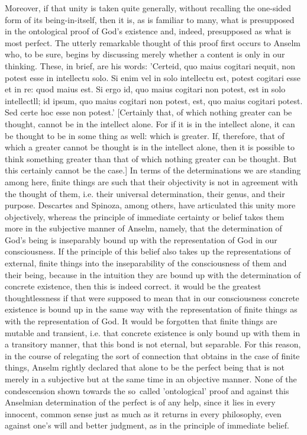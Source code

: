 Moreover, if that unity is taken quite generally,
without recalling the one-sided form of its being-in-itself,
then it is, as is familiar to many,
what is presupposed in the ontological proof of God's existence
and, indeed, presupposed as what is most perfect.
The utterly remarkable thought of this proof
first occurs to Anselm who, to be sure,
begins by discussing merely whether a content is
only in our thinking.
These, in brief, are his words:
'Certeid, quo maius cogitari nequit,
non potest esse in intellectu solo.
Si enim vel in solo intellectu est,
potest cogitari esse et in re: quod maius est.
Si ergo id, quo maius cogitari non potest,
est in solo intellectll;
id ipsum, quo maius cogitari non potest,
est, quo maius cogitari potest.
Sed certe hoc esse non potest.'
[Certainly that, of which nothing greater can be thought,
cannot be in the intellect alone.
For if it is in the intellect alone,
it can be thought to be in some thing as well: which is greater.
If, therefore, that of which a greater cannot be thought
is in the intellect alone,
then it is possible to think something greater
than that of which nothing greater can be thought.
But this certainly cannot be the case.]
In terms of the determinations
we are standing among here,
finite things are such that their objectivity
is not in agreement with the thought of them, i.e.
their universal determination, their genus, and their purpose.
Descartes and Spinoza, among others,
have articulated this unity more objectively,
whereas the principle of immediate certainty or belief
takes them more in the subjective manner of Anselm, namely,
that the determination of God's being is inseparably bound up
with the representation of God in our consciousness.
If the principle of this belief also takes up
the representations of external, finite things
into the inseparability of the consciousness
of them and their being,
because in the intuition they are bound up
with the determination of concrete existence,
then this is indeed correct.
it would be the greatest thoughtlessness
if that were supposed to mean that
in our consciousness concrete existence is bound up in
the same way with the representation of finite things
as with the representation of God.
It would be forgotten that finite things are
mutable and transient, i.e.
that concrete existence is only bound up
with them in a transitory manner,
that this bond is not eternal, but separable.
For this reason, in the course of relegating
the sort of connection that obtains
in the case of finite things,
Anselm rightly declared that alone
to be the perfect being
that is not merely in a subjective
but at the same time in an objective manner.
None of the condescension shown towards
the so~called 'ontological' proof
and against this Anselmian determination of the perfect
is of any help,
since it lies in every innocent, common sense
just as much as it returns in every philosophy,
even against one's will and better judgment,
as in the principle of immediate belief.


